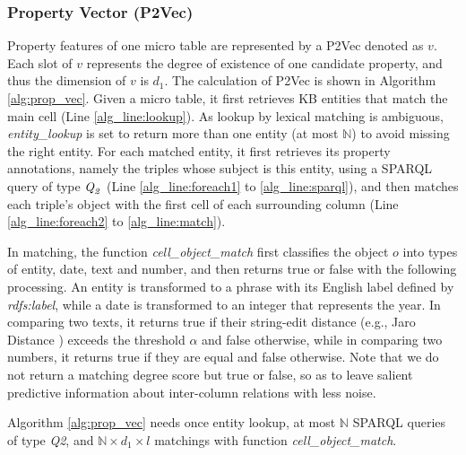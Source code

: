 \documentclass{article}
\begin{document}
\subsubsection{Property Vector (P2Vec)}
Property features of one micro table are represented by a P2Vec denoted as $v$.
Each slot of $v$ represents the degree of existence of one candidate property, 
and thus the dimension of $v$ is $d_1$.
The calculation of P2Vec is shown in Algorithm \ref{alg:prop_vec}.
Given a micro table, it first retrieves KB entities that match the main cell (Line \ref{alg_line:lookup}).
As lookup by lexical matching is ambiguous,
\textit{entity\_lookup} is set to return more than one entity (at most $\mathbb{N}$) to avoid missing the right entity. 
For each matched entity, it first retrieves its property annotations, namely the triples whose subject is this entity, using a SPARQL query of type $\textit{\textit{Q}}_\text{\textit{2}}$ (Line \ref{alg_line:foreach1} to \ref{alg_line:sparql}),
and then matches each triple's object with the first cell of each surrounding column (Line \ref{alg_line:foreach2} to \ref{alg_line:match}).

In matching, the function \textit{cell\_object\_match} first classifies the object $o$ into types of entity, date, text and number, 
and then returns true or false with the following processing.
An entity is transformed to a phrase with its English label defined by \textit{rdfs:label},
while 
a date is transformed to an integer that represents the year.
In comparing two texts, it returns true if their string-edit distance (e.g., Jaro Distance \cite{cohen2003comparison}) exceeds the threshold $\alpha$ and false otherwise,
while in comparing two numbers, it returns true if they are equal and false otherwise. 
Note that we do not
return a 
matching degree score but true or false, 
so as to leave salient predictive information about inter-column relations with less noise.


Algorithm \ref{alg:prop_vec} needs once entity lookup, at most $\mathbb{N}$ SPARQL queries of type \textit{Q2}, 
and $\mathbb{N} \times d_1 \times l$ matchings with function \textit{cell\_object\_match}.
\end{document}
